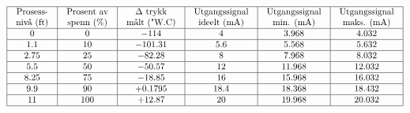 
$$\vbox{\offinterlineskip
\halign{\strut
\vrule \quad\hfil # \ \hfil & 
\vrule \quad\hfil # \ \hfil & 
\vrule \quad\hfil # \ \hfil & 
\vrule \quad\hfil # \ \hfil & 
\vrule \quad\hfil # \ \hfil & 
\vrule \quad\hfil # \ \hfil \vrule \cr
\noalign{\hrule}
%
Prosess- & Prosent av & $\Delta$ trykk & Utgangssignal & Utgangssignal & Utgangssignal \cr
%
nivå (ft) & spenn (\%) & målt ("W.C) & ideelt (mA) & min. (mA) & maks. (mA) \cr
%
\noalign{\hrule}
%
0 & 0 & $-114$ & 4 & 3.968 & 4.032 \cr
%
\noalign{\hrule}
%
1.1 & 10 & $-101.31$ & 5.6 & 5.568 & 5.632 \cr
%
\noalign{\hrule}
%
2.75 & 25 & $-82.28$ & 8 & 7.968 & 8.032 \cr
%
\noalign{\hrule}
%
5.5 & 50 & $-50.57$ & 12 & 11.968 & 12.032 \cr
%
\noalign{\hrule}
%
8.25 & 75 & $-18.85$ & 16 & 15.968 & 16.032 \cr
%
\noalign{\hrule}
%
9.9 & 90 & +0.1795 & 18.4 & 18.368 & 18.432 \cr
%
\noalign{\hrule}
%
11 & 100 & +12.87 & 20 & 19.968 & 20.032 \cr
%
\noalign{\hrule}
} %
}$$ %


